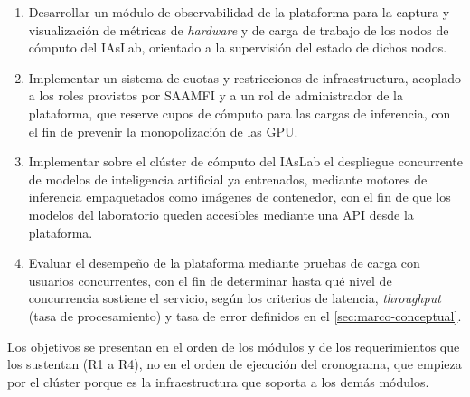 \begin{enumerate}
  \item \label{obj:telemetria} Desarrollar un módulo de observabilidad de la plataforma para la captura y visualización de métricas de \emph{hardware} y de carga de trabajo de los nodos de cómputo del IAsLab, orientado a la supervisión del estado de dichos nodos.

  \item \label{obj:gobernanza} Implementar un sistema de cuotas y restricciones de infraestructura, acoplado a los roles provistos por SAAMFI y a un rol de administrador de la plataforma, que reserve cupos de cómputo para las cargas de inferencia, con el fin de prevenir la monopolización de las GPU.

  \item \label{obj:orquestacion} Implementar sobre el clúster de cómputo del IAsLab el despliegue concurrente de modelos de inteligencia artificial ya entrenados, mediante motores de inferencia empaquetados como imágenes de contenedor, con el fin de que los modelos del laboratorio queden accesibles mediante una API desde la plataforma.

  \item \label{obj:evaluacion} Evaluar el desempeño de la plataforma mediante pruebas de carga con usuarios concurrentes, con el fin de determinar hasta qué nivel de concurrencia sostiene el servicio, según los criterios de latencia, \emph{throughput} (tasa de procesamiento) y tasa de error definidos en el \cref{sec:marco-conceptual}.
\end{enumerate}

Los objetivos se presentan en el orden de los módulos y de los requerimientos que los sustentan (R1 a R4), no en el orden de ejecución del cronograma, que empieza por el clúster porque es la infraestructura que soporta a los demás módulos.
